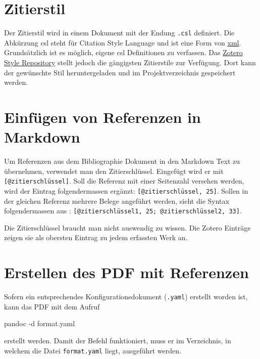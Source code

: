 \documentclass[
  nswissgerman,
  a4paper,
  DIV=11,
  numbers=noendperiod,
  ngerman]{scrreprt}
\newenvironment{Shaded}{\begin{snugshade}}{\end{snugshade}}
\newcommand{\AttributeTok}[1]{\textcolor[rgb]{0.40,0.45,0.13}{#1}}
\newcommand{\ExtensionTok}[1]{\textcolor[rgb]{0.00,0.23,0.31}{#1}}
\newcommand{\NormalTok}[1]{\textcolor[rgb]{0.00,0.23,0.31}{#1}}
\begin{document}
\section{Zitierstil}\label{zitierstil}

Der Zitierstil wird in einem Dokument mit der Endung \texttt{.csl}
definiert. Die Abkürzung csl steht für Citation Style Language und ist
eine Form von
\href{https://de.wikipedia.org/wiki/Extensible_Markup_Language}{xml}.
Grundsätzlich ist es möglich, eigene csl Definitionen zu verfassen. Das
\href{https://www.zotero.org/styles}{Zotero Style Repository} stellt
jedoch die gängigsten Zitierstile zur Verfügung. Dort kann der
gewünschte Stil heruntergeladen und im Projektverzeichnis gespeichert
werden.

\section{Einfügen von Referenzen in Markdown}\label{sec-referenzen_einf}

Um Referenzen aus dem Bibliographie Dokument in den Markdown Text zu
übernehmen, verwendet man den Zitierschlüssel. Eingefügt wird er mit
\texttt{{[}@zitierschlüssel{]}}. Soll die Referenz mit einer Seitenzahl
versehen werden, wird der Eintrag folgendermassen ergänzt:
\texttt{{[}@zitierschlüssel,\ 25{]}}. Sollen in der gleichen Referenz
mehrere Belege angeführt werden, sieht die Syntax folgendermassen aus :
\texttt{{[}@zitierschlüssel1,\ 25;\ @zitierschlüssel2,\ 33{]}}.

Die Zitierschlüssel braucht man nicht auswendig zu wissen. Die Zotero
Einträge zeigen sie als obersten Eintrag zu jedem erfassten Werk an.

\section{Erstellen des PDF mit
Referenzen}\label{erstellen-des-pdf-mit-referenzen}

Sofern ein entsprechendes Konfigurationsdokument (\texttt{.yaml})
erstellt worden ist, kann das PDF mit dem Aufruf

\begin{Shaded}
\begin{Highlighting}[numbers=left,,]
\ExtensionTok{pandoc} \AttributeTok{{-}d}\NormalTok{ format.yaml}
\end{Highlighting}
\end{Shaded}

erstellt werden. Damit der Befehl funktioniert, muss er im Verzeichnis,
in welchem die Datei \texttt{format.yaml} liegt, ausgeführt werden.
\end{document}
